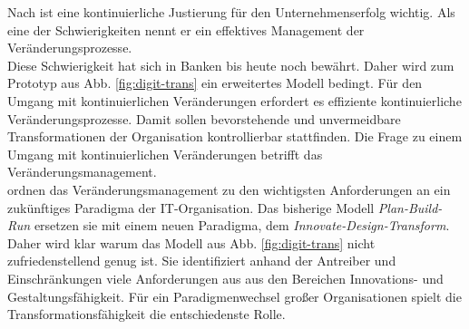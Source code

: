 Nach \citet[S.30]{Bussmann2006} ist eine kontinuierliche Justierung für den Unternehmenserfolg wichtig. Als eine der Schwierigkeiten nennt er ein effektives Management der Veränderungsprozesse.
\medskip
\\
Diese Schwierigkeit hat sich in Banken bis heute noch bewährt.
Daher wird zum Prototyp aus Abb. \ref{fig:digit-trans} ein erweitertes Modell bedingt. Für den Umgang mit kontinuierlichen Veränderungen erfordert es effiziente kontinuierliche Veränderungsprozesse.
Damit sollen bevorstehende und unvermeidbare Transformationen der Organisation kontrollierbar stattfinden.
Die Frage zu einem Umgang mit kontinuierlichen Veränderungen betrifft das Veränderungsmanagement.
\medskip
\\
\citet[S. 184f]{Koch2016} ordnen das Veränderungsmanagement zu den wichtigsten Anforderungen an ein zukünftiges Paradigma der IT-Organisation. Das bisherige Modell \emph{Plan-Build-Run} ersetzen sie mit einem neuen Paradigma, dem \emph{Innovate-Design-Transform}.
\medskip
\\
Daher wird klar warum das Modell aus Abb. \ref{fig:digit-trans} nicht zufriedenstellend genug ist. Sie identifiziert anhand der Antreiber und Einschränkungen viele Anforderungen aus \cite[Tab. 11.1]{Koch2016} aus den Bereichen Innovations- und Gestaltungsfähigkeit. Für ein Paradigmenwechsel großer Organisationen spielt die Transformationsfähigkeit die entschiedenste Rolle.
